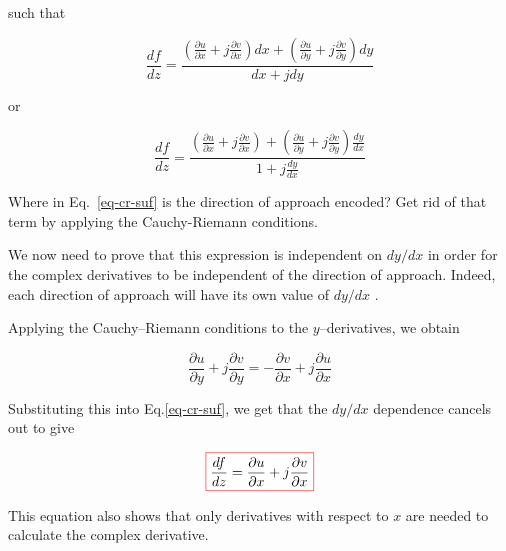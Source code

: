 such that

\begin{equation}
\frac{d f}{d z} = \frac{\left(\frac{\partial u}{\partial x}+j\frac{\partial v}{\partial x}\right) d x+\left(\frac{\partial u}{\partial y}+j\frac{\partial v}{\partial y}\right) d y}{d x + j d y}
\end{equation} 

or

\begin{equation}
\frac{d f}{d z} = \frac{\left(\frac{\partial u}{\partial x}+j\frac{\partial v}{\partial x}\right) +\left(\frac{\partial u}{\partial y}+j\frac{\partial v}{\partial y}\right) \frac{d y}{d x}}{1 + j \frac{d y}{d x}} \label{eq-cr-suf}
\end{equation} 

\begin{cue}
Where in Eq.~\ref{eq-cr-suf} is the direction of approach encoded? Get rid of that term by applying the Cauchy-Riemann conditions.
\end{cue}

We now need to prove that this expression is independent on $d y / d x$ in order for the complex derivatives to be independent of the direction of approach. Indeed, each direction of approach will have its own value of $d y / d x$ .

Applying the Cauchy--Riemann conditions to the $y$--derivatives, we obtain

\begin{equation}
\frac{\partial u}{\partial y}+j\frac{\partial v}{\partial y} = -\frac{\partial v}{\partial x}+j\frac{\partial u}{\partial x}
\end{equation}

Substituting this into Eq.\ref{eq-cr-suf}, we get that the $d y / d x$ dependence cancels out to give

\begin{equation}
\fbox{$\displaystyle
\frac{d f}{d z} = \frac{\partial u}{\partial x}+j\frac{\partial v}{\partial x}
$}
\end{equation} 

This equation also shows that only derivatives with respect to $x$ are needed to calculate the complex derivative.


